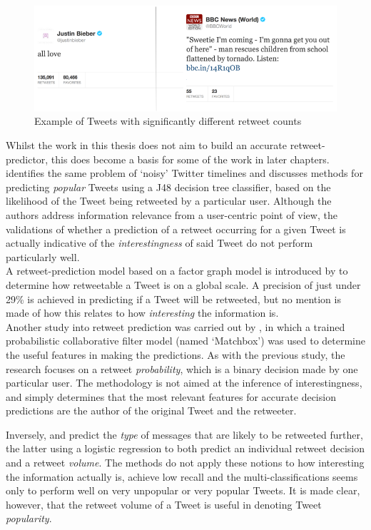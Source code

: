 \begin{figure}[h]
\centering
\includegraphics[scale=0.55]{2.Background/Media/compared_tweets.png} 
\caption{Example of Tweets with significantly different retweet counts}
\label{fig:tweet_comparison}
\end{figure}

Whilst the work in this thesis does not aim to build an accurate retweet-predictor, this does become a basis for some of the work in later chapters.\\
\cite{uysal11} identifies the same problem of `noisy' Twitter timelines and discusses methods for predicting \textit{popular} Tweets using a J48 decision tree classifier, based on the likelihood of the Tweet being retweeted by a particular user. Although the authors address information relevance from a user-centric point of view, the validations of whether a prediction of a retweet occurring for a given Tweet is actually indicative of the \textit{interestingness} of said Tweet do not perform particularly well.\\
A retweet-prediction model based on a factor graph model is introduced by \cite{yang10} to determine how retweetable a Tweet is on a global scale. A precision of just under 29\% is achieved in predicting if a Tweet will be retweeted, but no mention is made of how this relates to how \textit{interesting} the information is.\\
Another study into retweet prediction was carried out by \cite{zaman10}, in which a trained probabilistic collaborative filter model (named `Matchbox') was used to determine the useful features in making the predictions. As with the previous study, the research focuses on a retweet \textit{probability}, which is a binary decision made by one particular user. The methodology is not aimed at the inference of interestingness, and simply determines that the most relevant features for accurate decision predictions are the author of the original Tweet and the retweeter.

Inversely, \cite{suh10} and \cite{hong11} predict the \textit{type} of messages that are likely to be retweeted further, the latter using a logistic regression to both predict an individual retweet decision and a retweet \textit{volume}. The methods do not apply these notions to how interesting the information actually is, achieve low recall and the multi-classifications seems only to perform well on very unpopular or very popular Tweets. It is made clear, however, that the retweet volume of a Tweet is useful in denoting Tweet \textit{popularity}.

